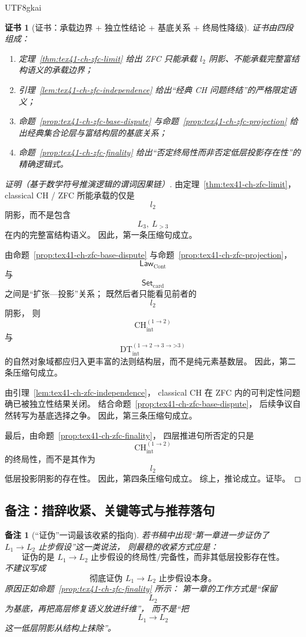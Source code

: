 \documentclass[12pt]{article}
\newtheorem{remark}{备注}[section]
\newtheorem{Certificate}{证书}[section]
\newcommand{\CHint}{\mathrm{CH}_{\mathrm{int}}}
\newcommand{\DTint}{\mathrm{DT}_{\mathrm{int}}}
\newcommand{\LawCont}{\mathsf{Law}_{\mathrm{Cont}}}
\newcommand{\SetCard}{\mathsf{Set}_{\mathrm{card}}}
\begin{document}
\begin{CJK*}{UTF8}{gkai}
\begin{Certificate}[证书：承载边界 + 独立性结论 + 基底关系 + 终局性降级]
\label{cert:tex41-ch-zfc-final}
证书由四段组成：
\begin{enumerate}
  \item 定理~\ref{thm:tex41-ch-zfc-limit} 给出 ZFC 只能承载 $l_2$ 阴影、不能承载完整富结构语义的承载边界；
  \item 引理~\ref{lem:tex41-ch-zfc-independence} 给出“经典 CH 问题终结”的严格限定语义；
  \item 命题~\ref{prop:tex41-ch-zfc-base-dispute} 与命题~\ref{prop:tex41-ch-zfc-projection} 给出经典集合论层与富结构层的基底关系；
  \item 命题~\ref{prop:tex41-ch-zfc-finality} 给出“否定终局性而非否定低层投影存在性”的精确逻辑式。
\end{enumerate}
\end{Certificate}

\begin{proof}[证明（基于数学符号推演逻辑的谓词因果链）]
由定理~\ref{thm:tex41-ch-zfc-limit}，
classical CH / ZFC 所能承载的仅是
\[
  l_2
\]
阴影，而不是包含
\[
  L_3,\ L_{>3}
\]
在内的完整富结构语义。
因此，第一条压缩句成立。

由命题~\ref{prop:tex41-ch-zfc-base-dispute} 与命题~\ref{prop:tex41-ch-zfc-projection}，
\[
  \LawCont
\]
与
\[
  \SetCard
\]
之间是“扩张—投影”关系；
既然后者只能看见前者的
\[
  l_2
\]
阴影，
则
\[
  \CHint^{(1\to2)}
\]
与
\[
  \DTint^{(1\to2\to3\to\text{>3})}
\]
的自然对象域都应归入更丰富的法则结构层，而不是纯元素基数层。
因此，第二条压缩句成立。

由引理~\ref{lem:tex41-ch-zfc-independence}，
classical CH 在 ZFC 内的可判定性问题确已被独立性结果关闭。
结合命题~\ref{prop:tex41-ch-zfc-base-dispute}，
后续争议自然转写为基底选择之争。
因此，第三条压缩句成立。

最后，由命题~\ref{prop:tex41-ch-zfc-finality}，
四层推进句所否定的只是
\[
  \CHint^{(1\to2)}
\]
的终局性，而不是其作为
\[
  l_2
\]
低层投影阴影的存在性。
因此，第四条压缩句成立。
综上，推论成立。证毕。
\end{proof}

\subsection{备注：措辞收紧、关键等式与推荐落句}
\label{subsec:tex41-ch-zfc-remarks}

\begin{remark}[“证伪”一词最该收紧的指向]
若书稿中出现“第一章进一步证伪了 $L_1\to L_2$ 止步假设”这一类说法，
则最稳的收紧方式应是：
\[
\boxed{
  \text{证伪的是 }L_1\to L_2\text{ 止步假设的终局性/完备性，而非其低层投影存在性。}
}
\]
不建议写成
\[
  \text{彻底证伪 }L_1\to L_2\text{ 止步假设本身。}
\]
原因正如命题~\ref{prop:tex41-ch-zfc-finality} 所示：
第一章的工作方式是“保留
\[
  L_2
\]
为基底，再把高层修复语义放进纤维”，
而不是“把
\[
  L_1\to L_2
\]
这一低层阴影从结构上抹除”。
\end{remark}


\end{CJK*}
\end{document}
